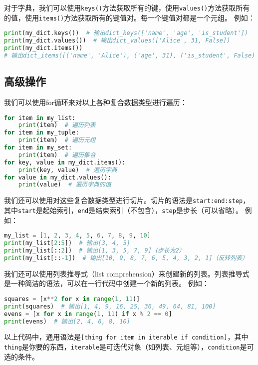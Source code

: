 对于字典，我们可以使用\texttt{keys()}方法获取所有的键，使用\texttt{values()}方法获取所有的值，使用\texttt{items()}方法获取所有的键值对。每一个键值对都是一个元组。
例如：

\begin{lstlisting}[language=python]
print(my_dict.keys())  # 输出dict_keys(['name', 'age', 'is_student'])
print(my_dict.values())  # 输出dict_values(['Alice', 31, False])
print(my_dict.items())
# 输出dict_items([('name', 'Alice'), ('age', 31), ('is_student', False)])
\end{lstlisting}

\subsection{高级操作}

我们可以使用for循环来对以上各种复合数据类型进行遍历：
\begin{lstlisting}[language=python]
for item in my_list:
    print(item)  # 遍历列表
for item in my_tuple:
    print(item)  # 遍历元组
for item in my_set:
    print(item)  # 遍历集合
for key, value in my_dict.items():
    print(key, value)  # 遍历字典
for value in my_dict.values():
    print(value)  # 遍历字典的值
\end{lstlisting}

我们还可以使用对这些复合数据类型进行切片。切片的语法是\texttt{start:end:step}，其中\texttt{start}是起始索引，\texttt{end}是结束索引（不包含），\texttt{step}是步长（可以省略）。
例如：
\begin{lstlisting}[language=python]
my_list = [1, 2, 3, 4, 5, 6, 7, 8, 9, 10]
print(my_list[2:5])  # 输出[3, 4, 5]
print(my_list[::2])  # 输出[1, 3, 5, 7, 9]（步长为2）
print(my_list[::-1])  # 输出[10, 9, 8, 7, 6, 5, 4, 3, 2, 1]（反转列表）
\end{lstlisting}

我们还可以使用列表推导式（list comprehension）来创建新的列表。列表推导式是一种简洁的语法，可以在一行代码中创建一个新的列表。
例如：
\begin{lstlisting}[language=python]
squares = [x**2 for x in range(1, 11)]
print(squares)  # 输出[1, 4, 9, 16, 25, 36, 49, 64, 81, 100]
evens = [x for x in range(1, 11) if x % 2 == 0]
print(evens)  # 输出[2, 4, 6, 8, 10]
\end{lstlisting}

以上代码中，通用语法是\texttt{[thing for item in iterable if condition]}，其中\texttt{thing}是你要的东西，\texttt{iterable}是可迭代对象（如列表、元组等），\texttt{condition}是可选的条件。

